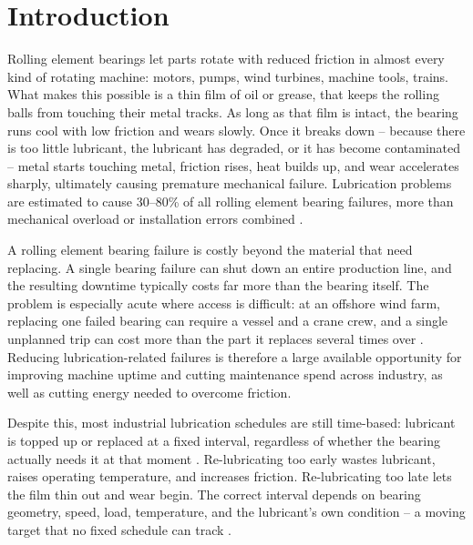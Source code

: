 
\section{Introduction}
\label{sec:intro}

Rolling element bearings let parts rotate with reduced friction in almost every kind of rotating machine: motors, pumps, wind turbines, machine tools, trains. What makes this possible is a thin film of oil or grease, that keeps the rolling balls from touching their metal tracks. As long as that film is intact, the bearing runs cool with low friction and wears slowly. Once it breaks down -- because there is too little lubricant, the lubricant has degraded, or it has become contaminated -- metal starts touching metal, friction rises, heat builds up, and wear accelerates sharply, ultimately causing premature mechanical failure. Lubrication problems are estimated to cause 30--80\% of all rolling element bearing failures, more than mechanical overload or installation errors combined \cite{skf_bearing_2017,schaeffler_rolling_2001,dai_situ_2024,xu_vibration-based_2024,nassef_impact_2022,isalm_oil_2021}.

A rolling element bearing failure is costly beyond the material that need replacing. A single bearing failure can shut down an entire production line, and the resulting downtime typically costs far more than the bearing itself. The problem is especially acute where access is difficult: at an offshore wind farm, replacing one failed bearing can require a vessel and a crane crew, and a single unplanned trip can cost more than the part it replaces several times over \cite{wakiru_review_2019}. Reducing lubrication-related failures is therefore a large available opportunity for improving machine uptime and cutting maintenance spend across industry, as well as cutting energy needed to overcome friction.

Despite this, most industrial lubrication schedules are still time-based: lubricant is topped up or replaced at a fixed interval, regardless of whether the bearing actually needs it at that moment \cite{skf_lubrication_2026}. Re-lubricating too early wastes lubricant, raises operating temperature, and increases friction. Re-lubricating too late lets the film thin out and wear begin. The correct interval depends on bearing geometry, speed, load, temperature, and the lubricant's own condition -- a moving target that no fixed schedule can track \cite{wakiru_review_2019}.

